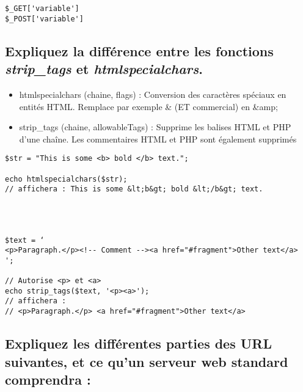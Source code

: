 \documentclass[11pt,a4paper]{article}
\begin{document}
\begin{verbatim}
$_GET['variable']
$_POST['variable']
\end{verbatim}

\bigskip

\subsection{Expliquez la différence entre les fonctions \textit{strip\_tags} et \textit{htmlspecialchars}.}

\bigskip

\begin{itemize}
\item htmlspecialchars (chaine, flags) : Conversion des caractères spéciaux en entités HTML. Remplace par exemple \& (ET commercial) en \&amp;
\item strip\_tags (chaine, allowableTags) : Supprime les balises HTML et PHP d'une chaîne. Les commentaires HTML et PHP sont également supprimés
\end{itemize}

\begin{verbatim}
$str = "This is some <b> bold </b> text.";

echo htmlspecialchars($str);
// affichera : This is some &lt;b&gt; bold &lt;/b&gt; text.




$text = ‘
<p>Paragraph.</p><!-- Comment --><a href="#fragment">Other text</a>
';

// Autorise <p> et <a>
echo strip_tags($text, '<p><a>');
// affichera :
// <p>Paragraph.</p> <a href="#fragment">Other text</a>
\end{verbatim}

\bigskip

\subsection{Expliquez les différentes parties des URL suivantes, et ce qu'un serveur web standard comprendra :}

\bigskip
\end{document}
